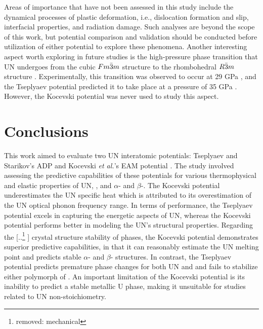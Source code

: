 \documentclass[preprint, 12pt]{elsarticle}
\providecommand{\DIFaddtex}[1]{{\protect\color{blue} \sf #1}} %
\providecommand{\DIFdeltex}[1]{{\protect\color{red} [..\footnote{removed: #1} ]}} %
\providecommand{\DIFaddbegin}{} %
\providecommand{\DIFaddend}{} %
\providecommand{\DIFdelbegin}{} %
\providecommand{\DIFdelend}{} %
\providecommand{\DIFadd}[1]{\texorpdfstring{\DIFaddtex{#1}}{#1}} %
\providecommand{\DIFdel}[1]{\texorpdfstring{\DIFdeltex{#1}}{}} %
\newcommand{\DIFscaledelfig}{0.5}
\newlength{\DIFdelgraphicswidth} %
\newlength{\DIFdelgraphicsheight} %
\newcommand{\DIFaddincludegraphics}[2][]{{\color{blue}\fbox{\DIFOincludegraphics[#1]{#2}}}} %
\newcommand{\DIFdelincludegraphics}[2][]{%
\sbox{\DIFdelgraphicsbox}{\DIFOincludegraphics[#1]{#2}}%
\settoboxwidth{\DIFdelgraphicswidth}{\DIFdelgraphicsbox} %
\settoboxtotalheight{\DIFdelgraphicsheight}{\DIFdelgraphicsbox} %
\scalebox{\DIFscaledelfig}{%
\parbox[b]{\DIFdelgraphicswidth}{\usebox{\DIFdelgraphicsbox}\\[-\baselineskip] \rule{\DIFdelgraphicswidth}{0em}}\llap{\resizebox{\DIFdelgraphicswidth}{\DIFdelgraphicsheight}{%
\setlength{\unitlength}{\DIFdelgraphicswidth}%
\begin{picture}(1,1)%
\thicklines\linethickness{2pt} %
{\color[rgb]{1,0,0}\put(0,0){\framebox(1,1){}}}%
{\color[rgb]{1,0,0}\put(0,0){\line( 1,1){1}}}%
{\color[rgb]{1,0,0}\put(0,1){\line(1,-1){1}}}%
\end{picture}%
}\hspace*{3pt}}} %
} %
\DeclareRobustCommand{\DIFaddbegin}{\DIFOaddbegin \let\includegraphics\DIFaddincludegraphics} %
\DeclareRobustCommand{\DIFaddend}{\DIFOaddend \let\includegraphics\DIFOincludegraphics} %
\DeclareRobustCommand{\DIFdelbegin}{\DIFOdelbegin \let\includegraphics\DIFdelincludegraphics} %
\DeclareRobustCommand{\DIFdelend}{\DIFOaddend \let\includegraphics\DIFOincludegraphics} %
\begin{document}

Areas of importance that have not been assessed in this study include the dynamical processes of plastic deformation, i.e., dislocation formation and slip, interfacial properties, and radiation damage. Such analyses are beyond the scope of this work, but potential comparison and validation should be conducted before utilization of either potential to explore these phenomena. \DIFaddbegin \DIFadd{Another interesting aspect worth exploring in future studies is the high-pressure phase transition that UN undergoes from the cubic $Fm\Bar{3}m$ structure to the rhombohedral $R\Bar{3}m$ structure \cite{Olsen1985, Modak2011, Mei2013}. Experimentally, this transition was observed to occur at 29 GPa \cite{Olsen1985}, and the Tseplyaev potential predicted it to take place at a pressure of 35 GPa \cite{Tseplyaev2016}. However, the Kocevski potential was never used to study this aspect.     
}\DIFaddend 


\section{Conclusions}

This work aimed to evaluate two UN interatomic potentials: Tseplyaev and Starikov's ADP \cite{Tseplyaev2016} and Kocevski \textit{et al.}'s EAM potential \cite{Kocevski2022II}. The study involved assessing the predictive capabilities of these potentials for various thermophysical and elastic properties of UN, , and $\alpha$- and $\beta$-. The Kocevski potential underestimates the UN specific heat which is attributed to its overestimation of the UN optical phonon frequency range. In terms of performance, the Tseplyaev potential excels in capturing the energetic aspects of UN, whereas the Kocevski potential performs better in modeling the UN's structural properties. Regarding the \DIFdelbegin \DIFdel{mechanical }\DIFdelend \DIFaddbegin \DIFadd{crystal structure }\DIFaddend stability of phases, the Kocevski potential demonstrates superior predictive capabilities, in that it can reasonably estimate the UN melting point and predicts stable $\alpha$- and $\beta$- structures. In contrast, the Tseplyaev potential predicts premature phase changes for both UN and  and fails to stabilize either polymorph of . An important limitation of the Kocevski potential is its inability to predict a stable metallic U phase, making it unsuitable for studies related to UN non-stoichiometry.
\end{document}
